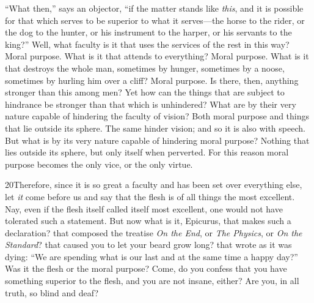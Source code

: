 ``What then,'' says an objector, ``if the matter stands like \emph{this}, and it is possible for that which serves to be superior to what it serves—the horse to the rider, or the dog to the hunter, or his instrument to the harper, or his servants to the king?'' Well, what faculty is it that uses the services of the rest in this way? Moral purpose. What is it that attends to everything? Moral purpose. What is it that destroys the whole man, sometimes by hunger, sometimes by a noose, sometimes by hurling him over a cliff? Moral purpose. Is there, then, anything stronger than this among men? Yet how can the things that are subject to hindrance be stronger than that which is unhindered? What are by their very nature capable of hindering the faculty of vision? Both moral purpose and things that lie outside its sphere. The same hinder vision; and so it is also with speech. But what is by its very nature capable of hindering moral purpose? Nothing that lies outside its sphere, but only itself when perverted. For this reason moral purpose becomes the only vice, or the only virtue.

20Therefore, since it is so great a faculty and has been set over everything else, let \emph{it} come before us and say that the flesh is of all things the most excellent. Nay, even if the flesh itself called itself most excellent, one would not have tolerated such a statement. But now what is it, Epicurus, that makes such a declaration? that composed the treatise \emph{On the End}, or \emph{The Physics}, or \emph{On the Standard}? that caused you to let your beard grow long? that wrote as it was dying: ``We are spending what is our last and at the same time a happy day?'' Was it the flesh or the moral purpose? Come, do you confess that you have something superior to the flesh, and you are not insane, either? Are you, in all truth, so blind and deaf?

